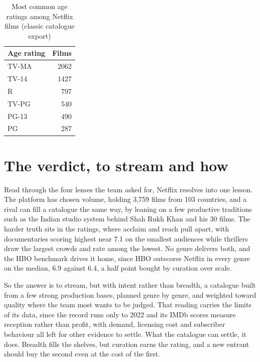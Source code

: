 \documentclass[11pt,preprint]{elsarticle}
\numberwithin{equation}{section}
\numberwithin{figure}{section}
\numberwithin{table}{section}
\begin{document}
\begin{longtable}[t]{lr}
\caption{\label{tab:agetab}\label{agetab}Most common age ratings among Netflix films (classic catalogue export)}\\
\toprule
Age rating & Films\\
\midrule
TV-MA & 2062\\
TV-14 & 1427\\
R & 797\\
TV-PG & 540\\
PG-13 & 490\\
\addlinespace
PG & 287\\
\bottomrule
\end{longtable}

\section*{The verdict, to stream and
how}\label{the-verdict-to-stream-and-how}

Read through the four lenses the team asked for, Netflix resolves into
one lesson. The platform has chosen volume, holding 3,759 films from 103
countries, and a rival can fill a catalogue the same way, by leaning on
a few productive traditions such as the Indian studio system behind Shah
Rukh Khan and his 30 films. The harder truth sits in the ratings, where
acclaim and reach pull apart, with documentaries scoring highest near
7.1 on the smallest audiences while thrillers draw the largest crowds
and rate among the lowest. No genre delivers both, and the HBO benchmark
drives it home, since HBO outscores Netflix in every genre on the
median, 6.9 against 6.4, a half point bought by curation over scale.

So the answer is to stream, but with intent rather than breadth, a
catalogue built from a few strong production bases, planned genre by
genre, and weighted toward quality where the team most wants to be
judged. That reading carries the limits of its data, since the record
runs only to 2022 and its IMDb scores measure reception rather than
profit, with demand, licensing cost and subscriber behaviour all left
for other evidence to settle. What the catalogue can settle, it does.
Breadth fills the shelves, but curation earns the rating, and a new
entrant should buy the second even at the cost of the first.


\end{document}
